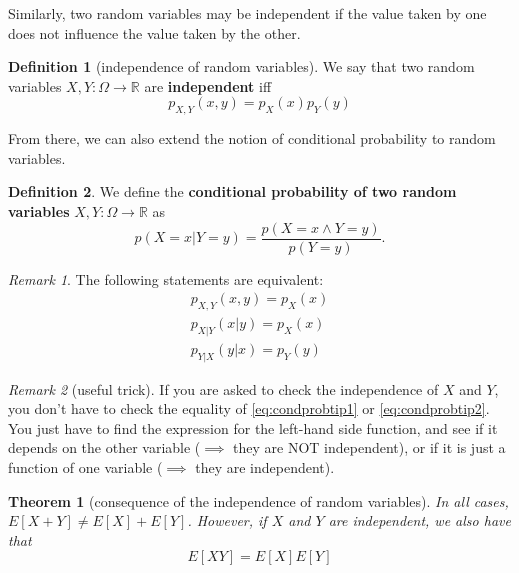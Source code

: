 \documentclass{article}
\theoremstyle{plain}
\newtheorem{thm}{Theorem}
\theoremstyle{definition}
\newtheorem{defn}{Definition}
\theoremstyle{remark}
\newtheorem*{remark}{Remark}
\begin{document}
Similarly, two random variables may be independent if the value taken by one does not influence the value taken by the other.

\begin{defn}[independence of random variables]
We say that two random variables $X, Y: \Omega \to \mathbb{R}$ are \textbf{independent} iff 
\begin{equation}
	p_{X, Y}(x,y) = p_X(x)p_Y(y)
\end{equation}
\end{defn}

From there, we can also extend the notion of conditional probability to random variables.
\begin{defn}
We define the \textbf{conditional probability of two random variables} $X, Y: \Omega \to \mathbb{R}$ as
\begin{equation}
	p(X=x | Y=y) = \dfrac{p(X=x \land Y=y)}{p(Y=y)}.
\end{equation}
\end{defn}

\begin{remark} The following statements are equivalent:
\begin{align}
	p_{X, Y}(x, y) = p_X(x) \\
	\label{eq:condprobtip1}
	p_{X|Y}(x|y) = p_X(x) \\
	\label{eq:condprobtip2}
	p_{Y|X}(y|x) = p_Y(y)
\end{align}
\end{remark}

\begin{remark}[useful trick] If you are asked to check the independence of $X$ and $Y$, you don't have to check the equality of \eqref{eq:condprobtip1} or \eqref{eq:condprobtip2}. You just have to find the expression for the left-hand side function, and see if it depends on the other variable ($\implies$ they are NOT independent), or if it is just a function of one variable ($\implies$ they are independent).
\end{remark}

\begin{thm}[consequence of the independence of random variables] In all cases, $E[X+Y] \neq E[X] + E[Y]$. However, if $X$ and $Y$ are \emph{independent}, we also have that
\begin{equation}
	E[XY] = E[X]E[Y]
\end{equation}
\end{thm}
\end{document}
